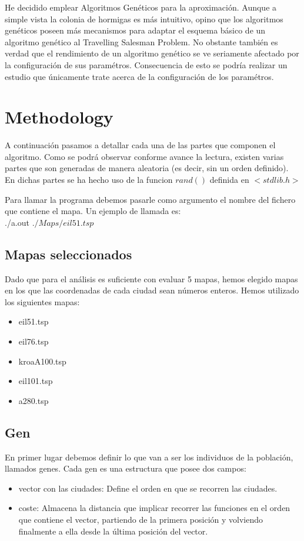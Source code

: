 \documentclass{article}
\begin{document}
    He decidido emplear Algoritmos Genéticos para la aproximación. Aunque a simple vista la colonia de hormigas es más 
    intuitivo, opino que los algoritmos genéticos poseen más mecanismos para adaptar el esquema básico de un algoritmo genético 
    al Travelling Salesman Problem. No obstante también es verdad que el rendimiento de un algoritmo genético se ve seriamente 
    afectado por la configuración de sus paramétros. Consecuencia de esto se podría realizar un estudio que únicamente trate acerca
    de la configuración de los paramétros. 
    
\section{Methodology}
A continuación pasamos a detallar cada una de las partes que componen el algoritmo. Como se podrá observar conforme avance la
lectura, existen varias partes que son generadas de manera aleatoria (es decir, sin un orden definido). En dichas partes se ha 
hecho uso de la funcion $rand()$ definida en $<stdlib.h>$

Para llamar la programa debemos pasarle como argumento el nombre del fichero que contiene el mapa. Un ejemplo de llamada es:
\\ 
\hspace{5mm} ./a.out $./Maps/eil51.tsp$ 

\subsection{Mapas seleccionados}
    Dado que para el análisis es suficiente con evaluar 5 mapas, hemos elegido mapas en los que las coordenadas de cada ciudad 
    sean números enteros. Hemos utilizado los siguientes mapas:
    \begin{itemize}
        \item eil51.tsp
        \item eil76.tsp
        \item kroaA100.tsp
        \item eil101.tsp
        \item a280.tsp
    \end{itemize}

\subsection{Gen}
    En primer lugar debemos definir lo que van a ser los individuos de la población, llamados genes. Cada gen es una estructura 
    que posee dos campos:
    \begin{itemize}
        \item vector con las ciudades: Define el orden en que se recorren las ciudades. 
        \item coste: Almacena la distancia que implicar recorrer las funciones en el orden que contiene el vector, partiendo de 
        la primera posición y volviendo finalmente a ella desde la última posición del vector. 
    \end{itemize} 
\end{document}
